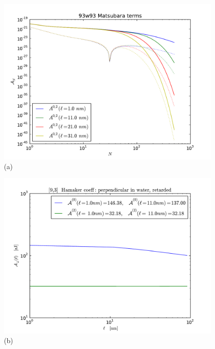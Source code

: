 \documentclass[onecolumn,letterpaper,amsmath,amssymb,floatfix,aps,superscriptaddress]{revtex4}
\begin{document}
\begin{figure}[t!]
\begin{center}
\begin{minipage}[b]{0.40\textwidth}
\begin{center}
\includegraphics[width=1.2\textwidth]{plots/93_A_vs_n.pdf} (a)
\end{center}
\end{minipage}
\hskip 43pt
\begin{minipage}[b]{0.40\textwidth}
\begin{center}
\includegraphics[width=1.2\textwidth]{plots/140322_93w93_HCs_perpendicular_ret.pdf} (b)
\end{center}

\end{minipage}
\end{center}
\end{figure}
\end{document}
